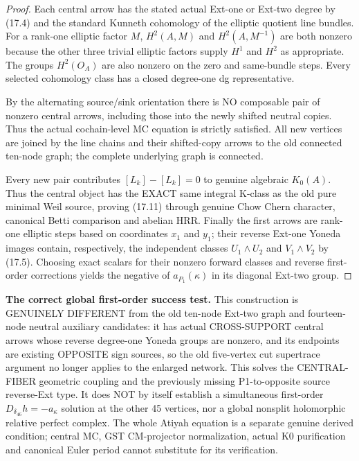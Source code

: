 \documentclass[11pt,a4paper]{article}
\begin{document}
\begin{proof}
Each
central
arrow has
the stated
actual
Ext-one
or Ext-two
degree by
(17.4) and
the standard
Kunneth
cohomology
of the
elliptic
quotient
line bundles.
For a
rank-one
elliptic
factor \(M\),
\(H^2(A,M)\)
and
\(H^2(A,M^{-1})\)
are both
nonzero
because the
other three
trivial
elliptic
factors
supply
\(H^1\) and
\(H^2\) as
appropriate.
The groups
\(H^2(O_A)\)
are also
nonzero
on the
zero and
same-bundle
steps.
Every selected
cohomology
class has a
closed
degree-one
dg representative.

By the
alternating
source/sink
orientation
there is
NO composable
pair of
nonzero
central arrows,
including
those into
the newly
shifted
neutral
copies.
Thus the
actual
cochain-level
MC equation
is strictly
satisfied.
All new
vertices are
joined by
the line
chains and
their shifted-copy
arrows to
the old
connected
ten-node
graph; the
complete
underlying
graph is
connected.

Every new
pair contributes
\([L_k]-[L_k]=0\)
to genuine
algebraic
\(K_0(A)\).
Thus the
central
object has
the EXACT
same
integral
K-class
as the old
pure
minimal
Weil source,
proving
(17.11)
through genuine
Chow Chern
character,
canonical
Betti comparison
and abelian
HRR.
Finally the
first arrows
are
rank-one
elliptic
steps based
on coordinates
\(x_1\)
and \(y_1\);
their reverse
Ext-one
Yoneda images
contain,
respectively,
the independent
classes
\(U_1\wedge U_2\)
and
\(V_1\wedge V_2\)
by (17.5).
Choosing exact
scalars for
their nonzero
forward classes
and reverse
first-order
corrections
yields the
negative of
\(a_{P_1}(\kappa)\)
in its
diagonal
Ext-two group.
\end{proof}

\noindent\textbf{The correct global first-order success test.}
This construction
is GENUINELY
DIFFERENT from
the old
ten-node
Ext-two
graph and
fourteen-node
neutral
auxiliary
candidates:
it has
actual
CROSS-SUPPORT
central arrows
whose reverse
degree-one
Yoneda groups
are nonzero,
and its
endpoints are
existing OPPOSITE
sign sources,
so the old
five-vertex
cut supertrace
argument no
longer applies
to the enlarged
network.
This solves
the
CENTRAL-FIBER
geometric
coupling
and the
previously
missing
P1-to-opposite
source
reverse-Ext
type.
It does
NOT by
itself
establish a
simultaneous
first-order
\(D_{\delta_{46}}h
   =-a_\kappa\)
solution
at the other
45 vertices,
nor a
global
nonsplit
holomorphic
relative
perfect complex.
The whole
Atiyah equation
is a separate
genuine
derived
condition;
central
MC, GST
CM-projector
normalization,
actual
K0 purification
and canonical
Euler period
cannot
substitute
for its
verification.
\end{document}
